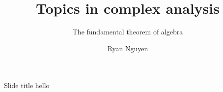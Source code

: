 \documentclass{beamer}
\title[Complex analysis]{Topics in complex analysis}
\subtitle{The fundamental theorem of algebra}
\author{Ryan Nguyen}
\institute{institute}
\date{}
\begin{document}
\begin{frame}
\titlepage
\end{frame}

\begin{frame}{Slide title}
hello
\end{frame}
\end{document}
